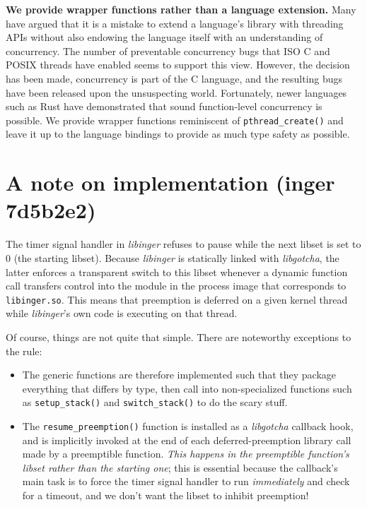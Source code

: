\documentclass[12pt,letterpaper]{book}
\begin{document}
\textbf{We provide wrapper functions rather than a language extension.}  Many
	have argued that it is a mistake to extend a language's library with
	threading APIs without also endowing the language itself with an
	understanding of concurrency.  The number of preventable concurrency bugs
	that ISO C and POSIX threads have enabled seems to support this view.
	However, the decision has been made, concurrency is part of the C language,
	and the resulting bugs have been released upon the unsuspecting world.
	Fortunately, newer languages such as Rust have demonstrated that sound
	function-level concurrency is possible.  We provide wrapper functions
	reminiscent of \texttt{pthread\_create()} and leave it up to the language
	bindings to provide as much type safety as possible.


\section{A note on implementation (inger 7d5b2e2)}

The timer signal handler in \textit{libinger} refuses to pause while the next libset is set to 0 (the
starting libset).  Because \textit{libinger} is statically linked with \textit{libgotcha}, the latter enforces a
transparent switch to this libset whenever a dynamic function call transfers control into the module
in the process image that corresponds to \texttt{libinger.so}.  This means that preemption is deferred on a
given kernel thread while \textit{libinger}'s own code is executing on that thread.

Of course, things are not quite that simple.  There are noteworthy exceptions to the rule:
\begin{itemize}
\item The generic
	functions are therefore implemented such that they package everything that differs by type, then
	call into non-specialized functions such as \texttt{setup\_stack()} and \texttt{switch\_stack()} to do the scary
	stuff.
\item The \texttt{resume\_preemption()} function is installed as a \textit{libgotcha} callback hook, and is implicitly
	invoked at the end of each deferred-preemption library call made by a preemptible function.
	\textit{This happens in the preemptible function's libset rather than the starting one}; this is
	essential because the callback's main task is to force the timer signal handler to run
	\textit{immediately} and check for a timeout, and we don't want the libset to inhibit preemption!
\end{itemize}
\end{document}
